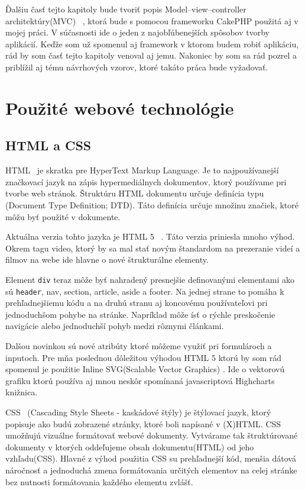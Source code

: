 \documentclass[12pt,oneside]{book}
\begin{document}
Ďalšiu časť tejto kapitoly bude tvoriť popis Model–view–controller architektúry(MVC) \cite{UvodMVC}\ , ktorá bude s pomocou frameworku CakePHP použitá aj v mojej práci. V súčasnosti ide o jeden z najobľúbenejších spôsobov tvorby aplikácií. Keďže som už spomenul aj framework v ktorom budem robiť aplikáciu, rád by som časť tejto kapitoly venoval aj jemu.
Nakoniec by som sa rád pozrel a priblížil aj tému návrhových vzorov, ktoré takáto práca bude vyžadovať.\newpage



\section{Použité webové technológie}
\subsection{HTML a CSS}
HTML \cite{HTML}\ je skratka pre HyperText Markup Language. Je to najpoužívanejší značkovací jazyk na zápis hypermediálnych dokumentov, ktorý používame pri tvorbe web stránok. Štruktúru HTML dokumentu určuje definícia typu (Document Type Definition; DTD). Táto definícia určuje množinu značiek, ktoré môžu byť použité v dokumente. 

Aktuálna verzia tohto jazyka je HTML 5 \cite{HTML5}\ . Táto verzia priniesla mnoho výhod. Okrem tagu video, ktorý by sa mal stať novým štandardom na prezeranie videí a filmov na webe ide hlavne o nové štrukturálne elementy.
 
Element \texttt{div} teraz môže byť nahradený presnejšie definovanými elementami ako sú \texttt{header}, nav, section, article, aside a footer. Na jednej strane to pomáha k prehľadnejšiemu kódu a na druhú stranu aj koncovému používateľovi pri jednoduchšom pohybe na stránke. Napríklad môže ísť o rýchle preskočenie navigácie alebo jednoduchší pohyb medzi rôznymi článkami.

Dalšou novinkou sú nové atribúty ktoré môžeme využiť pri formulároch a inputoch. Pre mňa poslednou dôležitou výhodou HTML 5 ktorú by som rád spomenul je použitie Inline SVG(Scalable Vector Graphics) . Ide o vektorovú grafiku ktorú používa aj mnou neskôr spomínaná javascriptová Highcharts knižnica.

CSS \cite{CSS21}\ (Cascading Style Sheets - kaskádové štýly) je štýlovací jazyk, ktorý popisuje ako budú zobrazené stránky, ktoré boli napísané v (X)HTML. CSS umožňujú vizuálne formátovať webové dokumenty. Vytvárame tak štruktúrované dokumenty v ktorých oddeľujeme obsah dokumentu(HTML) od jeho vzhľadu(CSS). Hlavné z výhod použitia CSS su prehľadnejší kód, menšia dátová náročnosť a jednoduchá zmena formátovania určitých elementov na celej stránke bez nutnosti formátovania každého elementu zvlášť. 
\end{document}
